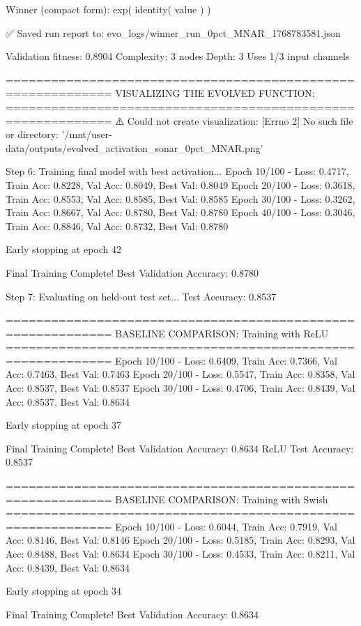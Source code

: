 Winner (compact form):
 exp(
  identity(
    value
  )
)

✅ Saved run report to: evo_logs/winner_run_0pct_MNAR_1768783581.json

Validation fitness: 0.8904
Complexity: 3 nodes
Depth: 3
Uses 1/3 input channels

============================================================
VISUALIZING THE EVOLVED FUNCTION:
============================================================
⚠️ Could not create visualization: [Errno 2] No such file or directory: '/mnt/user-data/outputs/evolved_activation_sonar_0pct_MNAR.png'

Step 6: Training final model with best activation...
Epoch  10/100 - Loss: 0.4717, Train Acc: 0.8228, Val Acc: 0.8049, Best Val: 0.8049
Epoch  20/100 - Loss: 0.3618, Train Acc: 0.8553, Val Acc: 0.8585, Best Val: 0.8585
Epoch  30/100 - Loss: 0.3262, Train Acc: 0.8667, Val Acc: 0.8780, Best Val: 0.8780
Epoch  40/100 - Loss: 0.3046, Train Acc: 0.8846, Val Acc: 0.8732, Best Val: 0.8780

Early stopping at epoch 42

Final Training Complete!
Best Validation Accuracy: 0.8780

Step 7: Evaluating on held-out test set...
Test Accuracy: 0.8537

============================================================
BASELINE COMPARISON: Training with ReLU
============================================================
Epoch  10/100 - Loss: 0.6409, Train Acc: 0.7366, Val Acc: 0.7463, Best Val: 0.7463
Epoch  20/100 - Loss: 0.5547, Train Acc: 0.8358, Val Acc: 0.8537, Best Val: 0.8537
Epoch  30/100 - Loss: 0.4706, Train Acc: 0.8439, Val Acc: 0.8537, Best Val: 0.8634

Early stopping at epoch 37

Final Training Complete!
Best Validation Accuracy: 0.8634
ReLU Test Accuracy: 0.8537

============================================================
BASELINE COMPARISON: Training with Swish
============================================================
Epoch  10/100 - Loss: 0.6044, Train Acc: 0.7919, Val Acc: 0.8146, Best Val: 0.8146
Epoch  20/100 - Loss: 0.5185, Train Acc: 0.8293, Val Acc: 0.8488, Best Val: 0.8634
Epoch  30/100 - Loss: 0.4533, Train Acc: 0.8211, Val Acc: 0.8439, Best Val: 0.8634

Early stopping at epoch 34

Final Training Complete!
Best Validation Accuracy: 0.8634

